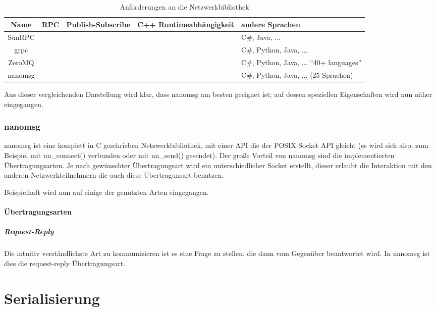 \clearpage %
\begin{table}[h]
\centering
\begin{tabu}{c | c | c | c | p{5cm}}
	\toprule
	Name & RPC & Publish-Subscribe & C++ Runtimeabh{\"{a}}ngigkeit & andere Sprachen \\
	\midrule
	SunRPC & \checkmark & \xmark & \checkmark & C\#, Java, ... \\
	grpc\cite{grpc} & \checkmark & \xmark & \xmark & C\#, Python, Java, ... \\
	ZeroMQ\cite{zeromq} & \xmark & \checkmark & \xmark & C\#, Python, Java, ... \enquote{40+ languages} \\
	nanomsg\cite{nanomsg} & \xmark & \checkmark & \checkmark & C\#, Python, Java, ... (25 Sprachen) \\
	\bottomrule
\end{tabu}
\caption{Anforderungen an die Netzwerkbibliothek}
\end{table}

Aus dieser vergleichenden Darstellung wird klar, dass nanomsg am besten geeignet ist; auf dessen speziellen Eigenschaften wird nun n{\"{a}}her eingegangen.

\subsubsection{nanomsg}
nanomsg ist eine komplett in C geschrieben Netzwerkbibliothek, mit einer API die der POSIX Socket API gleicht (es wird sich also, zum Beispiel mit nn\_connect() verbunden oder mit nn\_send() gesendet).
Der gro{\ss}e Vorteil von nanomsg sind die implementierten {\"{U}}bertragungsarten. Je nach gew{\"{u}}nschter {\"{U}}bertragungsart wird ein unterschiedlicher Socket erstellt, dieser erlaubt die
Interaktion mit den anderen Netzwerkteilnehmern die auch diese {\"{U}}bertragunsart benutzen.

Beispielhaft wird nun auf einige der genutzten Arten eingegangen.

\paragraph{{\"{U}}bertragungsarten}
\subparagraph{Request-Reply} Die intuitiv verst{\"{a}}ndlichste Art zu kommunizieren ist es eine Frage zu stellen, die dann vom Gegen{\"{u}}ber beantwortet wird. In nanomsg ist dies die request-reply
{\"{U}}bertragungsart.

\clearpage
\section{Serialisierung}

